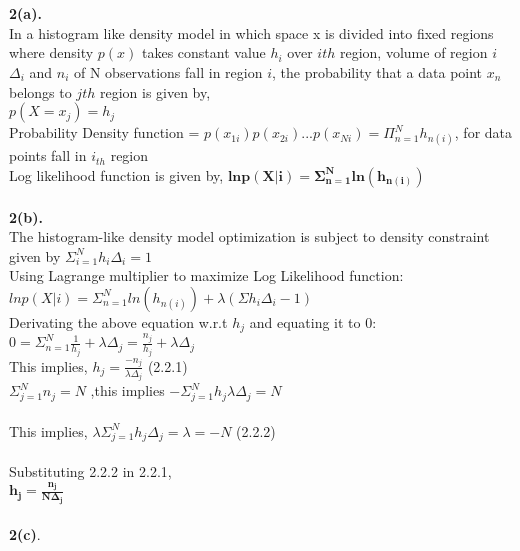 \documentclass{article}
\begin{document}
\section{}
\textbf{2(a).}\\
In a histogram like density model in which space x is divided into fixed regions where density $p(x)$ takes constant value $h_i$ over $ith$ region, volume of region $i$ $\Delta_i$ and $n_i$ of N observations fall in region $i$, the probability that a data point $x_n$ belongs to $jth$ region is given by,\\
$p(X=x_j)=h_j$\\
Probability Density function = $ p(x_{1i})p(x_{2i})...p(x_{Ni})= \Pi_{n=1}^N h_{n(i)}$, for data points fall in $i_{th}$ region\\
Log likelihood function is given by, $\mathbf{ln p(X|i)=\Sigma_{n=1}^N ln(h_{n(i)}) }$ 
\\
\\
\textbf{2(b).}\\
The histogram-like density model optimization is subject to density constraint given by $\Sigma_{i=1}^N h_i\Delta_i=1$\\
Using Lagrange multiplier to maximize Log Likelihood function:\\
$ln p(X|i)=\Sigma_{n=1}^N ln(h_{n(i)})+\lambda(\Sigma h_i\Delta_i - 1)$\\
Derivating the above equation w.r.t $h_j$ and equating it to $0$:\\
$0=\Sigma_{n=1}^N \frac{1}{h_j} + \lambda \Delta_j=\frac{n_j}{h_j}+ \lambda \Delta_j$\\
This implies, $h_j= \frac{-n_j}{\lambda \Delta_j}$   (2.2.1)\\ 
$\Sigma_{j=1}^N n_j=N$ ,this implies $-\Sigma_{j=1}^N h_j\lambda\Delta_j=N$\\
\\
This implies, $\lambda \Sigma_{j=1}^N h_j\Delta_j=  \lambda=-N$  (2.2.2)\\ 
\\
Substituting 2.2.2 in 2.2.1,\\
$\mathbf{h_j=\frac{n_j}{N\Delta_j}}$\\
\\
\textbf{2(c)}.
\end{document}
